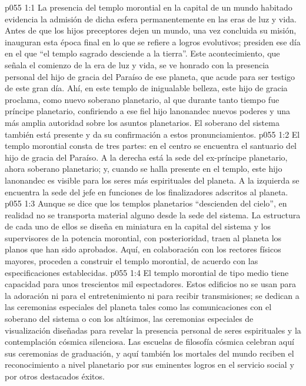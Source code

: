 \vs p055 1:1 La presencia del templo morontial en la capital de un mundo habitado evidencia la admisión de dicha esfera permanentemente en las eras de luz y vida. Antes de que los hijos preceptores dejen un mundo, una vez concluida su misión, inauguran esta época final en lo que se refiere a logros evolutivos; presiden ese día en el que “el templo sagrado desciende a la tierra”. Este acontecimiento, que señala el comienzo de la era de luz y vida, se ve honrado con la presencia personal del hijo de gracia del Paraíso de ese planeta, que acude para ser testigo de este gran día. Ahí, en este templo de inigualable belleza, este hijo de gracia proclama, como nuevo soberano planetario, al que durante tanto tiempo fue príncipe planetario, confiriendo a ese fiel hijo lanonandec nuevos poderes y una más amplia autoridad sobre los asuntos planetarios. El soberano del sistema también está presente y da su confirmación a estos pronunciamientos.
\vs p055 1:2 El templo morontial consta de tres partes: en el centro se encuentra el santuario del hijo de gracia del Paraíso. A la derecha está la sede del ex\hyp{}príncipe planetario, ahora soberano planetario; y, cuando se halla presente en el templo, este hijo lanonandec es visible para los seres más espirituales del planeta. A la izquierda se encuentra la sede del jefe en funciones de los finalizadores adscritos al planeta.
\vs p055 1:3 \pc Aunque se dice que los templos planetarios “descienden del cielo”, en realidad no se transporta material alguno desde la sede del sistema. La estructura de cada uno de ellos se diseña en miniatura en la capital del sistema y los supervisores de la potencia morontial, con posterioridad, traen al planeta los planos que han sido aprobados. Aquí, en colaboración con los rectores físicos mayores, proceden a construir el templo morontial, de acuerdo con las especificaciones establecidas.
\vs p055 1:4 \pc El templo morontial de tipo medio tiene capacidad para unos trescientos mil espectadores. Estos edificios no se usan para la adoración ni para el entretenimiento ni para recibir transmisiones; se dedican a las ceremonias especiales del planeta tales como las comunicaciones con el soberano del sistema o con los altísimos, las ceremonias especiales de visualización diseñadas para revelar la presencia personal de seres espirituales y la contemplación cósmica silenciosa. Las escuelas de filosofía cósmica celebran aquí sus ceremonias de graduación, y aquí también los mortales del mundo reciben el reconocimiento a nivel planetario por sus eminentes logros en el servicio social y por otros destacados éxitos.
